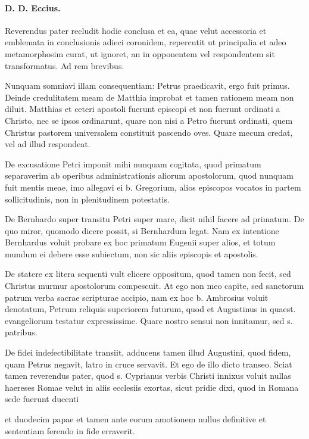 \paragraph*{D. D. Eccius.}

Reverendus pater recludit hodie conclusa et ea, quae velut accessoria et emblemata in conclusionis adieci coronidem, repercutit ut principalia et adeo metamorphosim curat, ut ignoret, an in opponentem vel respondentem sit transformatus. Ad rem brevibus.

Nunquam somniavi illam consequentiam: Petrus praedicavit, ergo fuit primus. Deinde credulitatem meam de Matthia improbat et tamen rationem meam non diluit. Matthias et ceteri apostoli fuerunt episcopi et non fuerunt ordinati a Christo, nec se ipsos ordinarunt, quare non nisi a Petro fuerunt ordinati, quem Christus pastorem universalem constituit pascendo oves. Quare mecum credat, vel ad illud respondeat.

De excusatione Petri imponit mihi nunquam cogitata, quod primatum separaverim ab operibus administrationis aliorum apostolorum, quod nunquam fuit mentis meae, imo allegavi ei b. Gregorium, alios episcopos vocatos in partem sollicitudinis, non in plenitudinem potestatis.

De Bernhardo super transitu Petri super mare, dicit nihil facere ad primatum. De quo miror, quomodo dicere possit, si Bernhardum legat. Nam ex intentione Bernhardus voluit probare ex hoc primatum Eugenii super alios, et totum mundum ei debere esse subiectum, non sic aliis episcopis et apostolis.

De statere ex litera sequenti vult elicere oppositum, quod tamen non fecit, sed Christus murmur apostolorum compescuit. At ego non meo capite, \marginpar{\small[321]} sed sanctorum patrum verba sacrae scripturae accipio, nam ex hoc b. Ambrosius voluit denotatum, Petrum reliquis superiorem futurum, quod et Augustinus in quaest. evangeliorum testatur expressissime. Quare nostro sensui non innitamur, sed s. patribus.

De fidei indefectibilitate transiit, adducens tamen illud Augustini, quod fidem, quam Petrus negavit, latro in cruce servavit. Et ego de illo dicto transeo. Sciat tamen reverendus pater, quod s. Cyprianus verbis Christi innixus voluit nullas haereses Romae velut in aliis ecclesiis exortas, sicut pridie dixi, quod in Romana sede fuerunt ducenti

et duodecim papae et tamen ante eorum amotionem nullus definitive et sententiam ferendo in fide erraverit.

